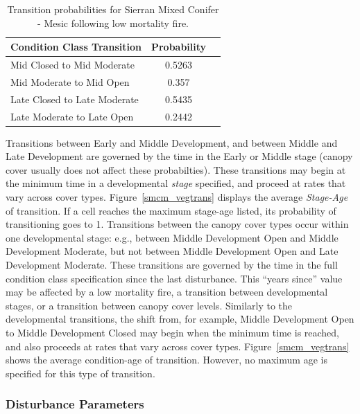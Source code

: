 \begin{table}[!htbp]
\small
\centering
\caption{Transition probabilities for Sierran Mixed Conifer - Mesic following low mortality fire.}
\label{smcm_firetrans}
\begin{tabular}{lcc}
\hline
\textbf{Condition Class Transition} & \textbf{Probability}\\
\hline
Mid Closed to Mid Moderate     	& 0.5263   	\\
Mid Moderate to Mid Open    	& 0.357		\\
Late Closed to Late Moderate	& 0.5435    \\
Late Moderate to Late Open     	& 0.2442    \\
\hline
\end{tabular}
\end{table}

Transitions between Early and Middle Development, and between Middle and Late Development are governed by the time in the Early or Middle stage (canopy cover usually does not affect these probabilties). These transitions may begin at the minimum time in a developmental \emph{stage} specified, and proceed at rates that vary across cover types. Figure~\ref{smcm_vegtrans} displays the average \emph{Stage-Age} of transition. If a cell reaches the maximum stage-age listed, its probability of transitioning goes to 1. Transitions between the canopy cover types occur within one developmental stage: e.g., between Middle Development Open and Middle Development Moderate, but not between Middle Development Open and Late Development Moderate. These transitions are governed by the time in the full condition class specification since the last disturbance. This ``years since'' value may be affected by a low mortality fire, a transition between developmental stages, or a transition between canopy cover levels. Similarly to the developmental transitions, the shift from, for example, Middle Development Open to Middle Development Closed may begin when the minimum time is reached, and also proceeds at rates that vary across cover types. Figure~\ref{smcm_vegtrans} shows the average condition-age of transition. However, no maximum age is specified for this type of transition.

\subsubsection{Disturbance Parameters} 
\label{subsubsec:distparams}

